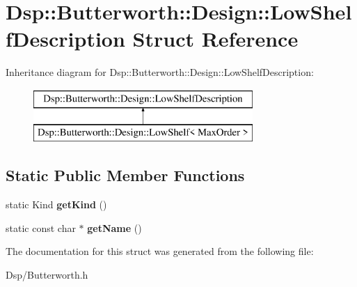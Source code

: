 \hypertarget{structDsp_1_1Butterworth_1_1Design_1_1LowShelfDescription}{\section{Dsp\-:\-:Butterworth\-:\-:Design\-:\-:Low\-Shelf\-Description Struct Reference}
\label{structDsp_1_1Butterworth_1_1Design_1_1LowShelfDescription}
}
Inheritance diagram for Dsp\-:\-:Butterworth\-:\-:Design\-:\-:Low\-Shelf\-Description\-:\begin{figure}[H]
\begin{center}
\leavevmode
\includegraphics[height=2.000000cm]{structDsp_1_1Butterworth_1_1Design_1_1LowShelfDescription}
\end{center}
\end{figure}
\subsection*{Static Public Member Functions}
\begin{DoxyCompactItemize}
\item 
\hypertarget{structDsp_1_1Butterworth_1_1Design_1_1LowShelfDescription_a6e1b4d98e84c93be495c8c6c33ecb684}{static Kind {\bfseries get\-Kind} ()}\label{structDsp_1_1Butterworth_1_1Design_1_1LowShelfDescription_a6e1b4d98e84c93be495c8c6c33ecb684}

\item 
\hypertarget{structDsp_1_1Butterworth_1_1Design_1_1LowShelfDescription_a81c99c9f7469194cfafe5959c7e7f1bb}{static const char $\ast$ {\bfseries get\-Name} ()}\label{structDsp_1_1Butterworth_1_1Design_1_1LowShelfDescription_a81c99c9f7469194cfafe5959c7e7f1bb}

\end{DoxyCompactItemize}


The documentation for this struct was generated from the following file\-:\begin{DoxyCompactItemize}
\item 
Dsp/Butterworth.\-h\end{DoxyCompactItemize}
